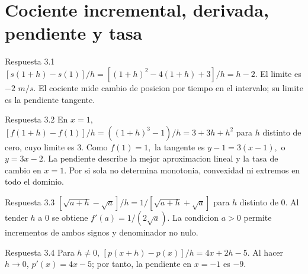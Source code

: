 \documentclass[10pt,a4paper,oneside,openany]{book}
\begin{document}
\section{Cociente incremental, derivada, pendiente y tasa}
\begin{PSevenAnswerFixed}{Respuesta 3.1}
\([s(1+h)-s(1)]/h=[(1+h)^{2}-4(1+h)+3]/h=h-2\). El limite es \(-2\) \(m/s\). El cociente mide cambio de posicion por tiempo en el intervalo; su limite es la pendiente tangente.
\end{PSevenAnswerFixed}
\begin{PSevenAnswerFixed}{Respuesta 3.2}
En \(x=1,\) \([f(1+h)-f(1)]/h=((1+h)^{3}-1)/h=3+3h+h^{2}\) para \(h\) distinto de cero, cuyo limite es \(3\). Como \(f(1)=1,\) la tangente es \(y-1=3(x-1),\) o \(y=3x-2\). La pendiente describe la mejor aproximacion lineal y la tasa de cambio en \(x=1\). Por si sola no determina monotonia, convexidad ni extremos en todo el dominio.
\end{PSevenAnswerFixed}
\begin{PSevenAnswerFixed}{Respuesta 3.3}
\([\sqrt{a+h}-\sqrt{a}]/h=1/[\sqrt{a+h}+\sqrt{a}]\) para \(h\) distinto de \(0\). Al tender \(h\) a \(0\) se obtiene \(f'(a)=1/(2\sqrt{a})\). La condicion \(a>0\) permite incrementos de ambos signos y denominador no nulo.
\end{PSevenAnswerFixed}
\begin{PSevenAnswerFixed}{Respuesta 3.4}
Para \(h\ne0\), \([p(x+h)-p(x)]/h=4x+2h-5\). Al hacer \(h\to0\), \(p'(x)=4x-5\); por tanto, la pendiente en \(x=-1\) es \(-9\).
\end{PSevenAnswerFixed}
\end{document}

